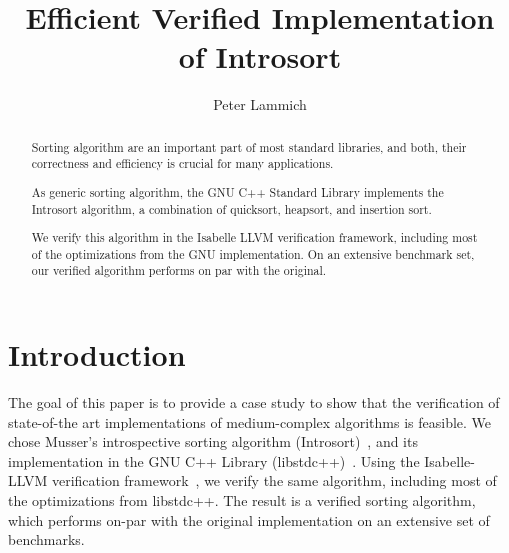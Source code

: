 \documentclass[sigplan,10pt,anonymous,review]{acmart}\settopmatter{printfolios=true,printccs=false,printacmref=false}
\theoremstyle{definition}
\begin{document}
\title{Efficient Verified Implementation of Introsort}


\author{Peter Lammich}
%

\begin{abstract}
  Sorting algorithm are an important part of most standard libraries, and
  both, their correctness and efficiency is crucial for many applications.

  As generic sorting algorithm, the GNU C++ Standard Library implements the Introsort algorithm,
  a combination of quicksort, heapsort, and insertion sort.

  We verify this algorithm in the Isabelle LLVM verification framework,
  including most of the optimizations from the GNU implementation.
  On an extensive benchmark set, our verified algorithm performs on par with the original.
\end{abstract}

\maketitle






\section{Introduction}
  The goal of this paper is to provide a case study to show that the verification of
  state-of-the art implementations of medium-complex algorithms is feasible.
  We chose Musser's introspective sorting algorithm (Introsort)~\cite{Muss97}, and its
  implementation in the GNU C++ Library (libstdc++)~\cite{libstdc++}.
  Using the Isabelle-LLVM verification framework~\cite{La19-llvm}, we verify the same algorithm,
  including most of the optimizations from libstdc++. The result is a verified sorting algorithm, which performs
  on-par with the original implementation on an extensive set of benchmarks.
\end{document}
